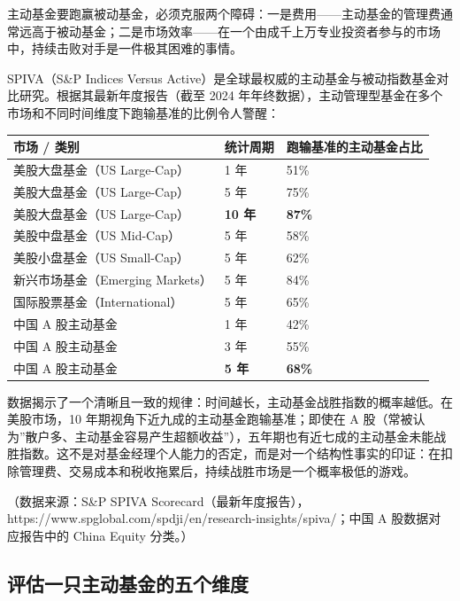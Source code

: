 \documentclass[a4paper,11pt,oneside,fontset=none,UTF8,zihao=-4]{ctexbook}
\begin{document}
主动基金要跑赢被动基金，必须克服两个障碍：一是费用------主动基金的管理费通常远高于被动基金；二是市场效率------在一个由成千上万专业投资者参与的市场中，持续击败对手是一件极其困难的事情。

SPIVA（S\&P Indices Versus
Active）是全球最权威的主动基金与被动指数基金对比研究。根据其最新年度报告（截至
2024
年年终数据），主动管理型基金在多个市场和不同时间维度下跑输基准的比例令人警醒：

\begin{longtable}[]{@{}lll@{}}
\toprule\noalign{}\rowcolor{dh-pink!25}
市场 / 类别 & 统计周期 & 跑输基准的主动基金占比 \\
\midrule\noalign{}
\endhead
\bottomrule\noalign{}
\endlastfoot
美股大盘基金（US Large-Cap） & 1 年 & 51\% \\
美股大盘基金（US Large-Cap） & 5 年 & 75\% \\
美股大盘基金（US Large-Cap） & \textbf{10 年} & \textbf{87\%} \\
美股中盘基金（US Mid-Cap） & 5 年 & 58\% \\
美股小盘基金（US Small-Cap） & 5 年 & 62\% \\
新兴市场基金（Emerging Markets） & 5 年 & 84\% \\
国际股票基金（International） & 5 年 & 65\% \\
中国 A 股主动基金 & 1 年 & 42\% \\
中国 A 股主动基金 & 3 年 & 55\% \\
中国 A 股主动基金 & \textbf{5 年} & \textbf{68\%} \\
\end{longtable}

数据揭示了一个清晰且一致的规律：时间越长，主动基金战胜指数的概率越低。在美股市场，10
年期视角下近九成的主动基金跑输基准；即使在 A
股（常被认为''散户多、主动基金容易产生超额收益''），五年期也有近七成的主动基金未能战胜指数。这不是对基金经理个人能力的否定，而是对一个结构性事实的印证：在扣除管理费、交易成本和税收拖累后，持续战胜市场是一个概率极低的游戏。

（数据来源：S\&P SPIVA
Scorecard（最新年度报告），https://www.spglobal.com/spdji/en/research-insights/spiva/；中国
A 股数据对应报告中的 China Equity 分类。）

\subsection{评估一只主动基金的五个维度}\label{ux8bc4ux4f30ux4e00ux53eaux4e3bux52a8ux57faux91d1ux7684ux4e94ux4e2aux7ef4ux5ea6}
\end{document}
